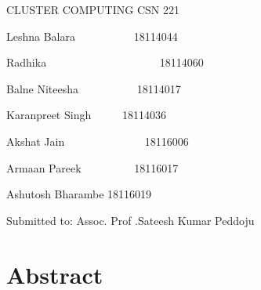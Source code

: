 \documentclass[a4paper]{article}
\title{}
\author{}
\date{2019-11-01}
\begin{document}
\clearpage\setcounter{page}{1}\pagestyle{Standard}
\thispagestyle{FirstPage}
{\centering
CLUSTER COMPUTING\newline
CSN 221
\par}


\bigskip


\bigskip


\bigskip

{\centering
Leshna Balara \ \ \ \ \ \ \ \ \ \ 18114044
\par}

{\centering
Radhika \ \ \ \ \ \ \ \ \ \ \ \ \ \ \ \ \ \ \ \ 18114060
\par}

{\centering
Balne Niteesha \ \ \ \ \ \ \ \ \ \ 18114017 
\par}

{\centering
Karanpreet Singh \ \ \ \ \ 18114036
\par}

{\centering
Akshat Jain \ \ \ \ \ \ \ \ \ \ \ \ \ \ 18116006
\par}

{\centering
Armaan Pareek \ \ \ \ \ \ \ \ \ 18116017 
\par}

{\centering
Ashutosh Bharambe 18116019
\par}


\bigskip


\bigskip


\bigskip


\bigskip


\bigskip


\bigskip


\bigskip


\bigskip

{\centering
Submitted to: Assoc. Prof .Sateesh Kumar Peddoju
\par}


\bigskip

\section{Abstract}
\end{document}
